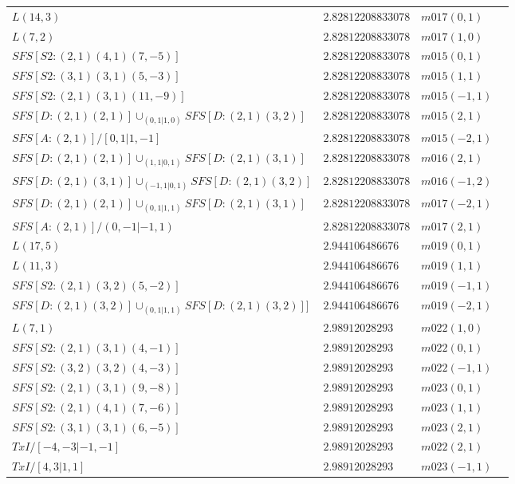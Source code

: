 \documentclass[a4paper]{gtart}
\theoremstyle{definition}
\theoremstyle{remark}
\numberwithin{equation}{section}
\begin{document}
\begin{center}
\begin{longtable}{llll}
		$L(14,3)$ & $2.82812208833078$ & $m017(0, 1)$ & \\
		$L(7,2)$ & $2.82812208833078$ & $m017(1, 0)$ & \\
		$SFS [S2: (2,1) (4,1) (7,-5)]$& $2.82812208833078$ & $m015(0, 1)$ &    \\
		$SFS [S2: (3,1) (3,1) (5,-3)]$& $2.82812208833078$ & $m015(1, 1)$ &    \\
		$SFS [S2: (2,1) (3,1) (11,-9)]$& $2.82812208833078$ & $m015(-1, 1)$ &    \\
		$SFS [D: (2,1) (2,1)] \cup_{(0,1 | 1,0)} SFS [D: (2,1) (3,2)]$ & $2.82812208833078$ & $m015(2, 1)$ & \\
		$SFS [A: (2,1)] / [ 0,1 | 1,-1 ]$ & $2.82812208833078$& $m015(-2, 1)$ & \\
		$SFS [D: (2,1) (2,1)] \cup_{(1,1 | 0,1)} SFS [D: (2,1) (3,1)]$ & $2.82812208833078$ & $m016(2, 1)$ & \\
		$SFS [D: (2,1) (3,1)] \cup_{(-1,1 | 0,1)} SFS [D: (2,1) (3,2)]$ & $2.82812208833078$ & $m016(-1, 2)$ & \\
		$SFS [D: (2,1) (2,1)] \cup_{(0,1 | 1,1)} SFS [D: (2,1) (3,1)]$ & $2.82812208833078$ & $m017(-2, 1)$ & \\
		$SFS [A: (2,1)] / ( 0,-1 | -1,1 )$ & $2.82812208833078$ & $m017(2, 1)$ & \\
		\midrule
		$L(17,5)$ & $ 2.944106486676$ & $m019(0, 1)$ & \\
		$L(11,3)$ & $ 2.944106486676$ & $m019(1, 1)$ & \\
		$SFS [S2: (2,1) (3,2) (5,-2)]	$ & $2.944106486676$ & $m019(-1, 1)$ &  \\
		$SFS [D: (2,1) (3,2)] \cup_{(0,1 | 1,1)} SFS [D: (2,1) (3,2)] ]	$ & $2.944106486676$ & $m019(-2, 1)$ &  \\
			\midrule
		$L(7,1)$ & $2.98912028293$ & $m022(1, 0)$ & \\
		$SFS [S2: (2,1) (3,1) (4,-1)]	$ & $2.98912028293$ & $m022(0, 1)$ &  \\
		$SFS [S2: (3,2) (3,2) (4,-3)]	$ & $2.98912028293$ & $m022(-1, 1)$ &  \\
		$SFS [S2: (2,1) (3,1) (9,-8)]	$ & $2.98912028293$ & $m023(0, 1)$ &  \\
		$SFS [S2: (2,1) (4,1) (7,-6)]	$ & $2.98912028293$ & $m023(1, 1)$ &  \\
		$SFS [S2: (3,1) (3,1) (6,-5)]	$ & $2.98912028293$ & $m023(2, 1)$ &  \\
		$T x I / [ -4,-3 | -1,-1 ]	$ & $2.98912028293$ & $m022(2, 1)$ &  \\
		$T x I / [ 4,3 | 1,1 ]	$ & $2.98912028293$ & $m023(-1, 1)$ &  \\

\end{longtable}
\end{center}
\end{document}
